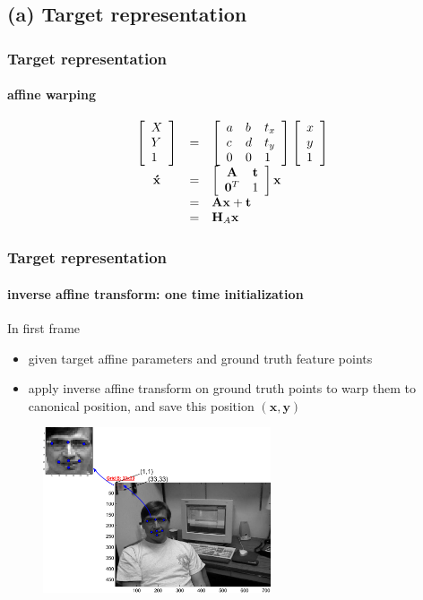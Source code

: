 \subsection{(a) Target representation}
\begin{frame}
\frametitle{Target representation}
\framesubtitle{affine warping}
\mypagenum
\begin{equation*}
\begin{array}{cllll}
\left[\begin{array}{l}X\\Y\\1\end{array}\right]   &=& \left[ \begin{array}{lll} a &b & t_x \\ c & d & t_y \\ 0 & 0 & 1 \\ \end{array} \right] \left[\begin{array}{l}x\\y\\1\end{array}\right]\\
\mathbf{\acute{x}} &=& \left[\begin{array}{cccc}\mathbf{A} & \mathbf{t}\\\mathbf{0}^T & 1\end{array}\right] \mathbf{x}\\
&=& \mathbf{A}\mathbf{x} + \mathbf{t}\\
&=& \mathbf{H}_A \mathbf{x}\\
\end{array}
\label{Eqn:top_level}
\end{equation*}
\end{frame}



\begin{frame}
\frametitle{Target representation}
\framesubtitle{inverse affine transform: one time initialization}
\mypagenum
In first frame
\begin{itemize}
\item given target affine parameters and ground truth feature points
\item apply inverse affine transform on ground truth points to warp them to canonical position, and save this position $(\mathbf{x, y})$
\end{itemize}
\begin{figure}[t]
\centering
\includegraphics[width=0.6\textwidth]{thesis/dataset_Dudek_00001_inverseAffine.pdf}
\label{fig:original_feature_points}
\end{figure}
\end{frame}




